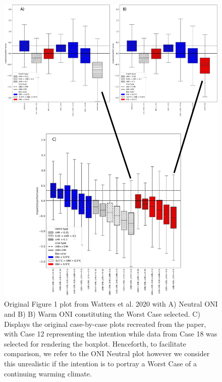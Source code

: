 \documentclass[]{elsarticle} %
\begin{document}
\begin{figure}
\includegraphics[width=0.75\linewidth]{./Watters EMM figures/Watters original and mistake} \caption{Original Figure 1 plot from Watters et al. 2020 with A) Neutral ONI and B) B) Warm ONI constituting the Worst Case selected.  C) Displays the original case-by-case plots recreated from the paper, with Case 12 representing the intention while data from Case 18 was selected for rendering the boxplot.  Henceforth, to facilitate comparison, we refer to the ONI Neutral plot however we consider this unrealistic if the intention is to portray a Worst Case of a continuing warming climate.}\label{fig:Watters original and mistake}
\end{figure}
\end{document}
